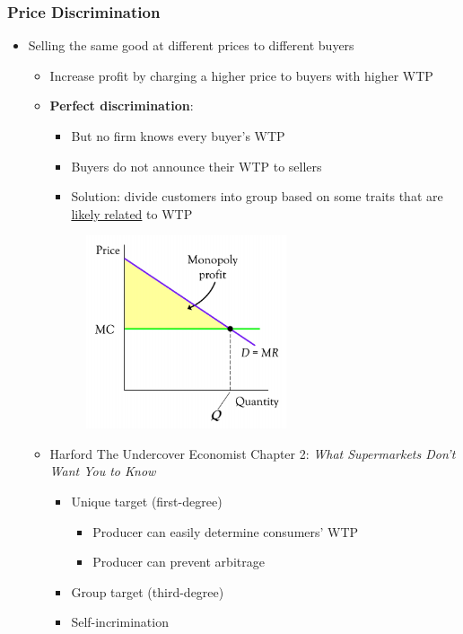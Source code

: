 \documentclass{article}
\begin{document}
\begin{multicols}{2}
\subsubsection{Price Discrimination}
\begin{itemize}
	\item Selling the same good at different prices to different buyers
	\begin{itemize}
		\item Increase profit by charging a higher price to buyers with higher WTP
		\item \textbf{Perfect discrimination}:
		\begin{itemize}
			\item But no firm knows every buyer's WTP
			\item Buyers do not announce their WTP to sellers
			\item Solution: divide customers into group based on some traits that are \underline{likely related} to WTP
		\end{itemize}
		\begin{figure}[H]
			\includegraphics[width=16em]{images/price_discrimination.png}
			\centering
		\end{figure}
	    \item Harford The Undercover Economist Chapter 2: \textit{What Supermarkets Don't Want You to Know}
	    \begin{itemize}
	    	\item Unique target (first-degree)
	    	\begin{itemize}
	    		\item Producer can easily determine consumers' WTP
	    		\item Producer can prevent arbitrage
	    	\end{itemize}
	    	\item Group target (third-degree)
	    	\item Self-incrimination
	    \end{itemize}
	\end{itemize}
\end{itemize}

\end{multicols}
\end{document}
